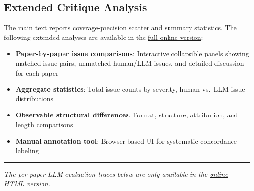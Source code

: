 \documentclass[
  11pt,
  letterpaper,
]{article}
\providecommand{\tightlist}{%
  \setlength{\itemsep}{0pt}\setlength{\parskip}{0pt}}
\begin{document}
\subsection{Extended Critique
Analysis}\label{extended-critique-analysis}

The main text reports coverage-precision scatter and summary statistics.
The following extended analyses are available in the
\href{https://llm-uj-research-eval.netlify.app/results_critiques.html}{full
online version}:

\begin{itemize}
\tightlist
\item
  \textbf{Paper-by-paper issue comparisons}: Interactive collapsible
  panels showing matched issue pairs, unmatched human/LLM issues, and
  detailed discussion for each paper
\item
  \textbf{Aggregate statistics}: Total issue counts by severity, human
  vs.~LLM issue distributions
\item
  \textbf{Observable structural differences}: Format, structure,
  attribution, and length comparisons
\item
  \textbf{Manual annotation tool}: Browser-based UI for systematic
  concordance labeling
\end{itemize}

\begin{center}\rule{0.5\linewidth}{0.5pt}\end{center}

\emph{The per-paper LLM evaluation traces below are only available in
the
\href{https://llm-uj-research-eval.netlify.app/appendix_llm_traces.html}{online
HTML version}.}
\end{document}

